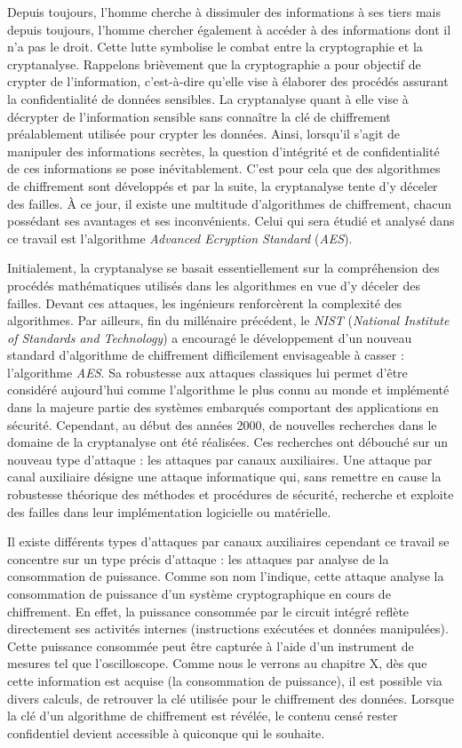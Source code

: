 \documentclass[oneside]{book}
\begin{document}
Depuis toujours, l’homme cherche à dissimuler des informations à ses tiers mais depuis toujours, l’homme chercher également à accéder à des informations dont il n’a pas le droit. Cette lutte symbolise le combat entre la cryptographie et la cryptanalyse. Rappelons brièvement que la cryptographie a pour objectif de crypter de l’information, c’est-à-dire qu’elle vise à élaborer des procédés assurant la confidentialité de données sensibles. La cryptanalyse quant à elle vise à décrypter de l'information sensible sans connaître la clé de chiffrement préalablement utilisée pour crypter les données. Ainsi, lorsqu'il s'agit de manipuler des informations secrètes, la question d'intégrité et de confidentialité de ces informations se pose inévitablement. C'est pour cela que des algorithmes de chiffrement sont développés et par la suite, la cryptanalyse tente d'y déceler des failles. À ce jour, il existe une multitude d'algorithmes de chiffrement, chacun possédant ses avantages et ses inconvénients. Celui qui sera étudié et analysé dans ce travail est l'algorithme \textit{Advanced Ecryption Standard} (\textit{AES}).

Initialement, la cryptanalyse se basait essentiellement sur la compréhension des procédés mathématiques utilisés dans les algorithmes en vue d'y déceler des failles. Devant ces attaques, les ingénieurs renforcèrent la complexité des algorithmes. Par ailleurs, fin du millénaire précédent, le \textit{NIST} (\textit{National Institute of Standards and Technology}) a encouragé le développement d’un nouveau standard d’algorithme de chiffrement difficilement envisageable à casser : l’algorithme \textit{AES}. Sa robustesse aux attaques classiques lui permet d'être considéré aujourd’hui comme l'algorithme le plus connu au monde et implémenté dans la majeure partie des systèmes embarqués comportant des applications en sécurité. Cependant, au début des années 2000, de nouvelles recherches dans le domaine de la cryptanalyse ont été réalisées. Ces recherches ont débouché sur un nouveau type d'attaque : les attaques par canaux auxiliaires. Une attaque par canal auxiliaire désigne une attaque informatique qui, sans remettre en cause la robustesse théorique des méthodes et procédures de sécurité, recherche et exploite des failles dans leur implémentation logicielle ou matérielle. 

Il existe différents types d'attaques par canaux auxiliaires cependant ce travail se concentre sur un type précis d'attaque : les attaques par analyse de la consommation de puissance. Comme son nom l'indique, cette attaque analyse la consommation de puissance d'un système cryptographique en cours de chiffrement. En effet, la puissance consommée par le circuit intégré reflète directement ses activités internes (instructions exécutées et données manipulées). Cette puissance consommée peut être capturée à l'aide d'un instrument de mesures tel que l'oscilloscope. Comme nous le verrons au chapitre X, dès que cette information est acquise (la consommation de puissance), il est possible via divers calculs, de retrouver la clé utilisée pour le chiffrement des données. Lorsque la clé d'un algorithme de chiffrement est révélée, le contenu censé rester confidentiel devient accessible à quiconque qui le souhaite.
\end{document}
